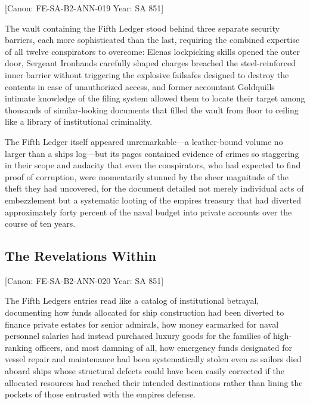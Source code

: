 {[}Canon: FE-SA-B2-ANN-019 \textbar{} Year: SA 851{]}

The vault containing the Fifth Ledger stood behind three separate
security barriers, each more sophisticated than the last, requiring the
combined expertise of all twelve conspirators to overcome:
Elena\textquotesingle s lockpicking skills opened the outer door,
Sergeant Ironhand\textquotesingle s carefully shaped charges breached
the steel-reinforced inner barrier without triggering the explosive
failsafes designed to destroy the contents in case of unauthorized
access, and former accountant Goldquill\textquotesingle s intimate
knowledge of the filing system allowed them to locate their target among
thousands of similar-looking documents that filled the vault from floor
to ceiling like a library of institutional criminality.

The Fifth Ledger itself appeared unremarkable---a leather-bound volume
no larger than a ship\textquotesingle s log---but its pages contained
evidence of crimes so staggering in their scope and audacity that even
the conspirators, who had expected to find proof of corruption, were
momentarily stunned by the sheer magnitude of the theft they had
uncovered, for the document detailed not merely individual acts of
embezzlement but a systematic looting of the empire\textquotesingle s
treasury that had diverted approximately forty percent of the naval
budget into private accounts over the course of ten years.

\subsection{The Revelations Within}\label{the-revelations-within}

{[}Canon: FE-SA-B2-ANN-020 \textbar{} Year: SA 851{]}

The Fifth Ledger\textquotesingle s entries read like a catalog of
institutional betrayal, documenting how funds allocated for ship
construction had been diverted to finance private estates for senior
admirals, how money earmarked for naval personnel salaries had instead
purchased luxury goods for the families of high-ranking officers, and
most damning of all, how emergency funds designated for vessel repair
and maintenance had been systematically stolen even as sailors died
aboard ships whose structural defects could have been easily corrected
if the allocated resources had reached their intended destinations
rather than lining the pockets of those entrusted with the
empire\textquotesingle s defense.

